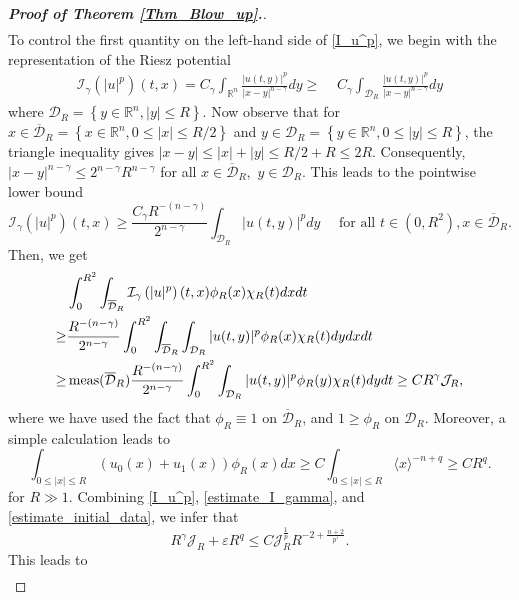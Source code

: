 \documentclass[11pt,reqno]{amsart}
\begin{document}
\begin{proof}[\textbf{Proof of Theorem \ref{Thm_Blow_up}.}]
\begin{align}
\end{align}
To control the first quantity on the left-hand side of \eqref{I_u^p}, we begin with the representation of the Riesz potential
\begin{align*}
\mathcal{I}_{\gamma}\left(|u|^p\right)(t,x)= C_\gamma\int_{\mathbb{R}^n} \displaystyle\frac{|u(t, y)|^p}{|x-y|^{n-\gamma}} d y
\geq & \,\,C_\gamma\int_{\mathcal{D}_R} \displaystyle\frac{|u(t, y)|^p}{|x-y|^{n-\gamma}} d y
\end{align*}
where $ \mathcal{D}_R=\left\{y \in \mathbb{R}^n, |y| \leq R\right\}$.
Now observe that for $x \in \overline{\mathcal{D}}_R=\left\{x \in \mathbb{R}^n, 0 \leq |x| \leq R/2\right\}$ and $y \in \mathcal{D}_R=\left\{y \in \mathbb{R}^n, 0 \leq |y| \leq R\right\}$, the triangle inequality gives $|x-y| \leq|x|+|y| \leq R/2+R \leq 2 R$. Consequently, $|x-y|^{n-\gamma} \leq 2^{n-\gamma} R^{n-\gamma}$ for all $x \in \overline{\mathcal{D}}_R,\,\, y \in \mathcal{D}_R$. This leads to the pointwise lower bound
$$
\mathcal{I}_{\gamma}\left(|u|^p\right)(t, x) \geq \frac{C_\gamma R^{-(n-\gamma)}}{2^{n-\gamma}} \int_{\mathcal{D}_R}|u(t, y)|^p d y \quad \text { for all } t \in (0, R^2), x \in \overline{\mathcal{D}}_R.
$$
Then, we get
\begin{align} \label{estimate_I_gamma}
&\int_0^{R^2} \int_{\overline{\mathcal{D}}_R} \mathcal{I}_{\gamma}\left(|u|^p\right)(t,x) \phi_R(x)\chi_R(t) d x d t \notag\\
\geq & \frac{R^{-(n-\gamma)}}{2^{n-\gamma}} \int_0^{R^2} \int_{\overline{\mathcal{D}}_R} \int_{\mathcal{D}_R} |u(t, y)|^p \phi_R(x)\chi_R(t) d y d x d t \notag\\
\geq & \operatorname{meas}(\overline{\mathcal{D}}_R) \frac{R^{-(n-\gamma)}}{2^{n-\gamma}} \int_0^{R^2} \int_{\mathcal{D}_R} |u(t, y)|^p \phi_R(y)\chi_R(t) d y d t \geq C R^\gamma \mathcal{J}_R,
\end{align}
where we have used the fact that $\phi_R \equiv 1$ on $\overline{\mathcal{D}}_R$, and $1 \geq \phi_R$ on $\mathcal{D}_R$. Moreover, a simple calculation leads to
\begin{equation} \label{estimate_initial_data}
\int_{0 \leq |x| \leq R}(u_0(x)+u_1(x))\phi_{R}(x)dx \geq C  \int_{0 \leq |x|\leq R}\langle x\rangle^{-n+q} \geq C  R^q.
\end{equation}
for $R\gg1$. Combining \eqref{I_u^p}, \eqref{estimate_I_gamma}, and \eqref{estimate_initial_data}, we infer that $$R^\gamma \mathcal{J}_R+ \varepsilon R^q \leq C \mathcal{J}_R^{\frac{1}{p}}R^{-2+\frac{n+2}{p'}}.$$ This leads to 
\begin{align*}

\end{align*}
\end{proof}
\end{document}
